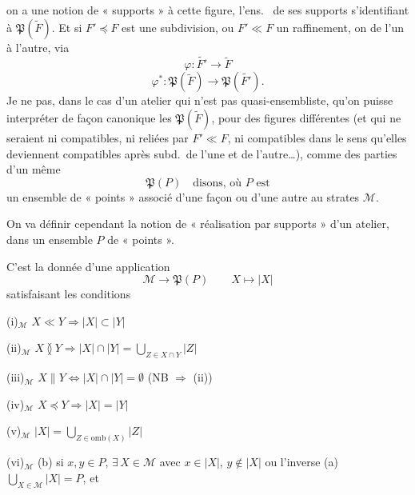 \documentclass[11pt,a4paper]{article}
\begin{document}
on a une notion de « supports  » \struck{\ill{}}  à cette figure, l'ens.\  de ses supports s'identifiant à $\mathfrak{P}(\widetilde{F})$. Et si $F' \preccurlyeq F$ est une subdivision, ou   $F' \ll F$ un raffinement, on   de l'un à l'autre, via
\[
  \varphi : \widetilde{F'} \longrightarrow \widetilde{F}
\]
\[
  \varphi^{*} : \mathfrak{P}(\widetilde{F}) \longrightarrow \mathfrak{P}(\widetilde{F'}) .
\]
Je ne  pas, dans le cas d'un atelier qui n'est pas quasi-ensembliste, qu'on puisse interpréter \struck{\ill{}} de façon canonique les $\mathfrak{P}(\widetilde{F})$, pour des figures différentes (et qui ne seraient ni compatibles, ni reliées par $F' \ll F$, ni compatibles dans le sens qu'elles deviennent compatibles après subd.\ de l'une et de l'autre…), comme des parties d'un même
\[
  \mathfrak{P}(P) \quad \text{disons, où } P \text{ est}
\]
un ensemble de « points » associé d'une façon ou d'une autre au \struck{\ill{}} strates $\mathcal{M}$.

On va définir cependant la notion de « réalisation par supports » d'un atelier, dans un ensemble $P$ de « points ».

C'est la donnée d'une application
\[
  \mathcal{M} \longrightarrow \mathfrak{P}(P) \qquad X \longmapsto |X|
\]
satisfaisant les conditions

(i)$_{\mathcal{M}}$ \quad $X \ll Y \Longrightarrow |X| \subset |Y|$ \quad {}

(ii)$_{\mathcal{M}}$ \quad $X \between Y \Longrightarrow |X| \cap |Y| = \bigcup_{Z \in X \cap Y} |Z|$

(iii)$_{\mathcal{M}}$ \quad $X \parallel Y \iff |X| \cap |Y| = \emptyset$ \quad (NB $\Rightarrow$  (ii))

(iv)$_{\mathcal{M}}$ \quad \struck{\ill{}} $X \preccurlyeq Y \Longrightarrow |X| = |Y|$

(v)$_{\mathcal{M}}$ \quad $|X| = \bigcup_{Z \in \mathrm{omb}(X)} |Z|$

(vi)$_{\mathcal{M}}$ \quad (b) si $x, y \in P$, $\exists\, X \in \mathcal{M}$ avec $x \in |X|$, $y \notin |X|$ ou l'inverse \quad (a) $\bigcup_{X \in \mathcal{M}} |X| = P$, et
\end{document}
